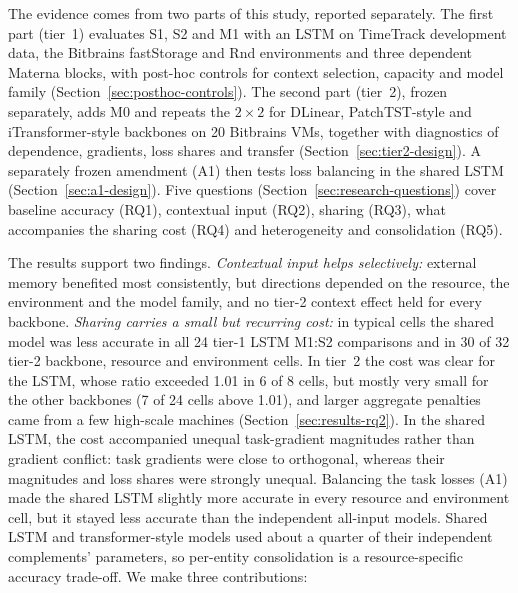 \documentclass[5p,twocolumn]{elsarticle}
\begin{document}
The evidence comes from two parts of this study, reported separately. The first
part (tier~1) evaluates S1, S2 and M1 with an LSTM on TimeTrack development data,
the Bitbrains fastStorage and Rnd environments and three dependent Materna
blocks, with post-hoc controls for context selection, capacity and model
family (Section~\ref{sec:posthoc-controls}). The second part (tier~2), frozen separately, adds M0
and repeats the $2\times2$ for DLinear, PatchTST-style and iTransformer-style
backbones on 20 Bitbrains VMs, together with diagnostics of dependence,
gradients, loss shares and transfer (Section~\ref{sec:tier2-design}). A
separately frozen amendment (A1) then tests loss balancing in the shared
LSTM (Section~\ref{sec:a1-design}). Five
questions (Section~\ref{sec:research-questions}) cover baseline accuracy
(RQ1), contextual input (RQ2), sharing (RQ3), what accompanies the sharing cost (RQ4) and
heterogeneity and consolidation (RQ5).

The results support two findings. \emph{Contextual input helps
selectively:} external memory benefited most consistently, but directions
depended on the resource, the environment and the model family, and no
tier-2 context effect held for every backbone. \emph{Sharing carries a small
but recurring cost:} in typical cells the shared model was less accurate in
all 24 tier-1 LSTM M1:S2 comparisons and in 30 of 32 tier-2 backbone,
resource and environment cells. In tier~2 the cost was clear for the LSTM,
whose ratio exceeded 1.01 in 6 of 8 cells, but mostly very small for the other
backbones (7 of 24 cells above 1.01), and larger aggregate penalties came from
a few high-scale machines (Section~\ref{sec:results-rq2}). In the shared LSTM, the cost accompanied
unequal task-gradient magnitudes rather than gradient conflict: task gradients
were close to orthogonal, whereas their magnitudes and loss shares were
strongly unequal. Balancing the task losses (A1) made the shared
LSTM slightly more accurate in every resource and environment cell, but it
stayed less accurate than the independent all-input models. Shared LSTM and transformer-style models used
about a quarter of their independent complements' parameters, so per-entity
consolidation is a resource-specific accuracy trade-off. We make three
contributions:
\end{document}
